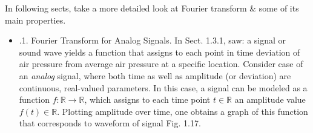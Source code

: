 \documentclass{article}
\begin{document}
\begin{itemize}
\begin{itemize}
		In following sects, take a more detailed look at Fourier transform \& some of its main properties.
		\begin{itemize}
			\item {.1. Fourier Transform for Analog Signals.} In Sect. 1.3.1, saw: a signal or sound wave yields a function that assigns to each point in time deviation of air pressure from average air pressure at a specific location. Consider case of an {\it analog} signal, where both time as well as amplitude (or deviation) are continuous, real-valued parameters. In this case, a signal can be modeled as a function $f:\mathbb{R}\to\mathbb{R}$, which assigns to each time point $t\in\mathbb{R}$ an amplitude value $f(t)\in\mathbb{R}$. Plotting amplitude over time, one obtains a graph of this function that corresponds to waveform of signal {\sf Fig. 1.17}.
			

\end{itemize}
\end{itemize}
\end{itemize}
\end{document}
